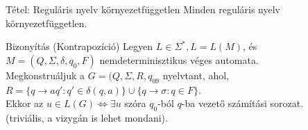 \documentclass{beamer}
\begin{document}
\begin{frame}
\begin{block}{Tétel: Reguláris nyelv környezetfüggetlen}
Minden reguláris nyelv környezetfüggetlen.
\end{block}

\begin{block}{Bizonyítás (Kontrapozíció)}
Legyen $L \in {\Sigma}^*, L = L(M)$, és\\
$M = (Q, {\Sigma}, {\delta}, q_0, F)$ nemdeterminisztikus véges automata.\\
\smallskip
Megkonstruáljuk a $G = (Q, {\Sigma}, R, q_09$ nyelvtant, ahol,\\
$R = \{q \rightarrow aq' : q' \in {\delta}(q, a)\} \cup \{q \rightarrow \sigma : q \in F \}$.\\
Ekkor az $u \in  L(G) \iff \exists u$ szóra $q_0$-ból $q$-ba vezető számítási sorozat.\\
(triviális, a vizygán is lehet mondani).
\end{block}

\end{frame}
\end{document}
